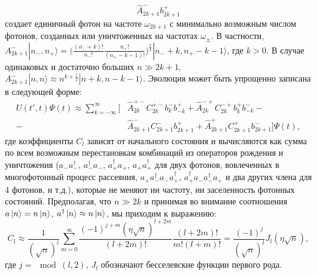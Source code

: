 \begin{equation}
	\hat{A}^-_{2k+1} b^+_{2k+1} 
	\label{Ap}
\end{equation}
создает единичный фотон на частоте $\omega_{2k+1}$ с минимально возможным числом фотонов, созданных или уничтоженных на частотах $\omega_\pm$.  
В частности, $A^-_{2k+1} |n_-,n_+\rangle = \big(\frac{(n_- + k)!}{n_-!} \frac{n_+!}{(n_+ - k-1)!} \big)^{\frac{1}{2}} |n_- + k, n_+ - k-1\rangle$, где $k>0$. В случае одинаковых и достаточно больших $n\gg 2k+1$, $A^-_{2k+1}|n,n\rangle \approx n^{k+\frac{1}{2}} |n + k, n - k-1\rangle$. 
Эволюция может быть упрощенно записана в следующей форме: 
\begin{equation}
	\begin{split}
	U(t',t)\Psi(t) \approx \sum_{k=-\infty}^{\infty} \big[&\hat{A}_{2k}^{+-} C^{+-}_{2k} b^-_{k} b^+_{-k} + \hat{A}_{2k}^{-+} C^{-+}_{2k} b^+_{k} b^-_{-k} -\\- &\hat{A}_{2k+1}^{-} C^{-}_{2k+1} b^+_{2k+1} + \hat{A}_{2k+1}^{+} C^{+}_{2k+1} b^-_{2k+1}\big] \Psi(t),
	\end{split}
	\label{uc}
\end{equation}
где коэффициенты $C_l$ зависят от начального состояния и вычисляются как сумма по всем возможным перестановкам комбинаций из операторов рождения и уничтожения ($a^{~}_{-} a^\dag_{-}$, $a^\dag_{-} a^{~}_{-}$, $a^\dag_{+} a^{~}_+$, $a^{~}_{+} a^\dag_{+}$ для двух фотонов, вовлеченных в многофотонный процесс рассеяния, $a^{~}_+ a^{\dag}_- a^{~}_- a^{\dag}_+$, $ a_+^\dag a^{~}_- a_-^\dag a^{~}_+$ и два других члена для 4 фотонов, и т.д.), которые не меняют ни частоту,  ни заселенность фотонных состояний. Предполагая, что $n \gg 2k$ и принимая во внимание соотношения $a\ket{n}=n \ket{n}$, $a^\dag\ket{n}\approx n \ket{n}$, мы приходим к выражению: 
\begin{equation}
	C_{l} \approx \frac{1}{(\sqrt{n})^l} \sum_{m=0}^\infty \frac{(-1)^{j+m}(\eta  \sqrt{n})^{l+2m}}{(l+2m)!} \frac{(l+2m)!}{m! (l+m)!} = \frac{(-1)^j}{(\sqrt{n})^l} J_l (\eta\sqrt{n}), 
\end{equation}
где $j = \mod(l,2)$, $J_l$ обозначают бесселевские функции первого рода. 

